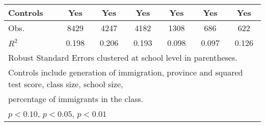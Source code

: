 \begin{table}[htbp]
\begin{tabular}{l*{6}{c}}
Controls            &         Yes         &         Yes         &         Yes         &         Yes         &         Yes         &         Yes         \\
\midrule
Obs.                &        8429         &        4247         &        4182         &        1308         &         686         &         622         \\
\(R^{2}\)           &       0.198         &       0.206         &       0.193         &       0.098         &       0.097         &       0.126         \\
\bottomrule
\multicolumn{7}{l}{\footnotesize Robust Standard Errors clustered at school level in parentheses.}\\
\multicolumn{7}{l}{\footnotesize Controls include generation of immigration, province and squared test score, class size, school size,}\\
\multicolumn{7}{l}{\footnotesize percentage of immigrants in the class.}\\
\multicolumn{7}{l}{\footnotesize \sym{*} \(p<0.10\), \sym{**} \(p<0.05\), \sym{***} \(p<0.01\)}\\
\end{tabular}
\end{table}
